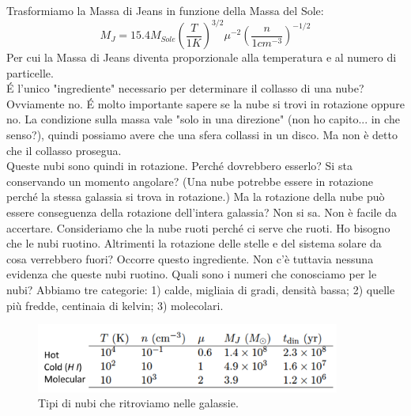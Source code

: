 \documentclass[a4paper,11pt]{article}
\begin{document}
Trasformiamo la Massa di Jeans in funzione della Massa del Sole:
$$
M_{J}=15.4 M_{Sole} (\frac{T}{1K})^{3/2} \mu^{-2} (\frac{n}{1cm^{-3}})^{-1/2}
$$
Per cui la Massa di Jeans diventa proporzionale alla temperatura e al numero di particelle. \\ \'E l'unico "ingrediente" necessario per determinare il collasso di una nube? Ovviamente no. \'E molto importante sapere se la nube si trovi in rotazione oppure no. La condizione sulla massa vale "solo in una direzione" (non ho capito... in che senso?), quindi possiamo avere che una sfera collassi in un disco. Ma non è detto che il collasso prosegua. \\ Queste nubi sono quindi in rotazione. Perché dovrebbero esserlo? Si sta conservando un momento angolare? (Una nube potrebbe essere in rotazione perché la stessa galassia si trova in rotazione.) Ma la rotazione della nube può essere conseguenza della rotazione dell'intera galassia? Non si sa. Non è facile da accertare. Consideriamo che la nube ruoti perché ci serve che ruoti. Ho bisogno che le nubi ruotino. Altrimenti la rotazione delle stelle e del sistema solare da cosa verrebbero fuori? Occorre questo ingrediente. Non c'è tuttavia nessuna evidenza che queste nubi ruotino. Quali sono i  numeri che conosciamo per le nubi? Abbiamo tre categorie: 1) calde, migliaia di gradi, densità bassa; 2) quelle più fredde, centinaia di kelvin; 3) molecolari. 
\begin{figure}[h!!]
        \centering
        \includegraphics[width=10cm]{lezione 28 novembre/tipidinubi.png}
        \caption{Tipi di nubi che ritroviamo nelle galassie.}
        \label{lezione 28 novembre/tipidinubi.png}
    \end{figure}
    \\
\end{document}
